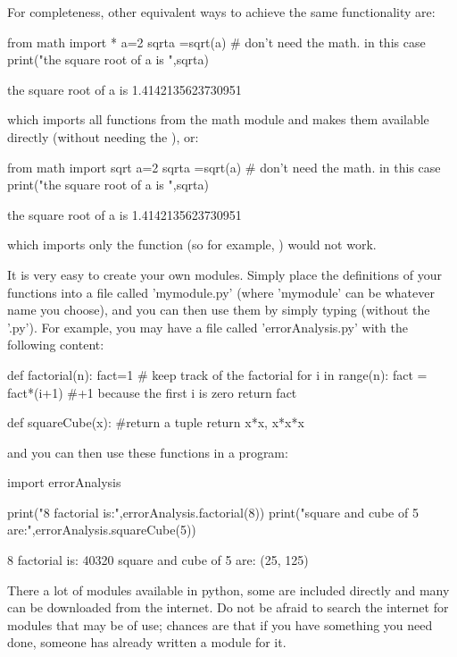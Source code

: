 For completeness, other equivalent ways to achieve the same functionality are:
\begin{python}[caption = Import everything from a module]
from math import *
a=2
sqrta =sqrt(a) # don't need the math. in this case
print("the square root of a is ",sqrta)
\end{python}
\begin{poutput}
the square root of a is  1.4142135623730951
\end{poutput}
which imports all functions from the math module and makes them available directly (without needing the ), or:
\begin{python}[caption = Importing a single function from a module]
from math import sqrt
a=2
sqrta =sqrt(a) # don't need the math. in this case
print("the square root of a is ",sqrta)
\end{python}
\begin{poutput}
the square root of a is  1.4142135623730951
\end{poutput}
which imports only the  function (so for example, ) would not work.

It is very easy to create your own modules. Simply place the definitions of your functions into a file called 'mymodule.py' (where 'mymodule' can be whatever name you choose), and you can then use them by simply typing  (without the '.py'). For example, you may have a file called 'errorAnalysis.py' with the following content:
\begin{python}[caption = Defining your own module]
def factorial(n):
    fact=1 # keep track of the factorial
    for i in range(n):
        fact = fact*(i+1) #+1 because the first i is zero
    return fact
    
def squareCube(x):
  #return a tuple
  return x*x, x*x*x    
\end{python}
and you can then use these functions in a program:
\begin{python}[caption = Importing your own module]
import errorAnalysis

print("8 factorial is:",errorAnalysis.factorial(8))
print("square and cube of 5 are:",errorAnalysis.squareCube(5))
\end{python}
\begin{poutput}
8 factorial is: 40320
square and cube of 5 are: (25, 125)
\end{poutput}
There a lot of modules available in python, some are included directly and many can be downloaded from the internet. Do not be afraid to search the internet for modules that may be of use; chances are that if you have something you need done, someone has already written a module for it.
